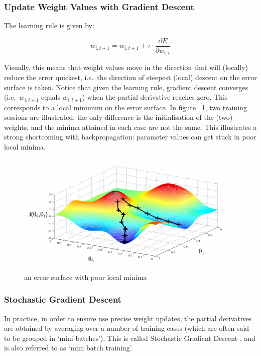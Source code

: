 \documentclass[a4paper,11pt]{article}
\begin{document}
\subsubsection{Update Weight Values with Gradient Descent}

The learning rule is given by:

\begin{equation}
 w_{i,t+1} = w_{i,t+1} + \tau \cdot \frac{\partial{E}}{\partial{w_{i,t}}}
 \label{eqn:learning_rule}
\end{equation}

Visually, this means that weight values move in the direction that will (locally) reduce the error quickest, i.e.\ the direction of steepest (local) descent on the error surface is taken. Notice that given the learning rule, gradient descent converges (i.e.\ $w_{i,t+1}$ equals $w_{i,t+1}$) when the partial derivative reaches zero. This corresponds to a local minimum on the error surface. In figure ~\ref{f14}, two training sessions are illustrated: the only difference is the initialisation of the (two) weights, and the minima attained in each case are not the same. This illustrates a strong shortcoming with backpropagation: parameter values can get stuck in poor local minima.

\begin{figure}[h!]
	\centering
	\includegraphics[scale=0.8]{images/local_minima.png}
	\caption{an error surface with poor local minima}
    \label{f14}
\end{figure}


\subsubsection{Stochastic Gradient Descent}

In practice, in order to ensure use precise weight updates, the partial derivatives are obtained by averaging over a number of training cases (which are often said to be grouped in `mini batches'). This is called Stochastic Gradient Descent \cite{DL-book}, and is also referred to as `mini batch training'.
\end{document}
